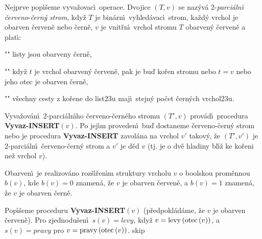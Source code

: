 \flushpar Nejprve pop\'\i\v seme vyva\v zovac\'\i\ operace. 
Dvojice $\left(T,v\right)$ se naz\'yv\'a 2-\emph{parci\'aln\'\i}
\emph{\v cerveno}-\emph{\v cern\'y} \emph{strom}, kdy\v z $T$ je 
bin\'arn\'\i\ vyhled\'avac\'\i\ strom, ka\v zd\'y vrchol je obarven 
\v cerven\v e nebo \v cern\v e, $v$ je 
vnit\v rn\'\i\ vrchol stromu $T$ obarven\'y \v cerven\v e a plat\'\i :
\roster
\item"{}"
listy jsou obarveny \v cern\v e,
\item"{}"
kdy\v z $t$ je vrchol obarven\'y \v cerven\v e, pak je bu\v d ko\v ren 
stromu nebo $t=v$ nebo jeho otec je obarven \v cern\v e,
\item"{}"
v\v sechny cesty z ko\v rene do list\accent23u maj\'\i\ stejn\'y 
po\v cet \v cer\-n\'ych vrchol\accent23u.
\endroster
\medskip

\flushpar Vyva\v zov\'an\'\i\ 2-parci\'aln\'\i ho \v cerveno-\v cern\'eho stromu $\left(T',v\right)$ 
pro\-v\'a\-d\'\i\ procedura {\bf Vyvaz-IN\-SERT$\left(v\right)$}.  Po jej\'\i m 
proveden\'\i\ bu\v d do\-sta\-neme \v cer\-ve\-no-\v cern\'y strom nebo 
je procedura {\bf Vyvaz-IN\-SERT} zavol\'ana na vrchol $
v'$ takov\'y, 
\v ze $\left(T',v'\right)$ je 2-parci\'aln\'\i\ \v cerve\-no-\v cern\'y strom a $
v'$ je d\v ed $v$ 
(tj.  je o dv\v e hladiny bl\'\i\v z ke ko\v reni ne\v z vrchol $
v$). 
\medskip

\flushpar Obarven\'\i\ je realizov\'ano roz\v s\'\i\v ren\'\i m struktury vrcholu $v$ 
o boolskou prom\v ennou $b\left(v\right)$, kde $b\left(v\right)=0$ znamen\'a, \v ze $v$ je obarven 
\v cerven\v e, a $b\left(v\right)=1$ znamen\'a, \v ze $v$ je obarven \v cern\v e.
\medskip

\flushpar Pop\'\i\v seme proceduru {\bf Vyvaz-INSERT$\left(v\right)$} (p\v redpokl\'ad\'ame, \v ze 
$v$ je obarven \v cerven\v e). Pro zjednodu\v sen\'\i\ $s\left(v
\right)=levy$, kdy\v z $v=\operatorname{levy}\left(\operatorname{otec}\left(v\right)\right)$, a $s\left(v\right)=pravy$ pro  
$v=\operatorname{pravy}\left(\operatorname{otec}\left(v\right)\right)$.
skip

